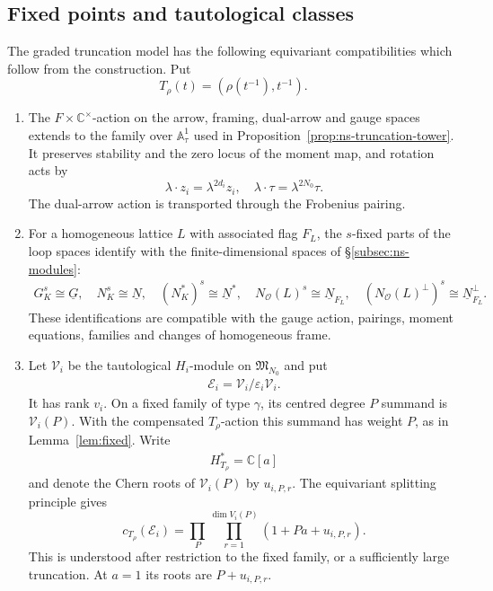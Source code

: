 \documentclass[11pt,reqno]{amsart}
\theoremstyle{definition}
\theoremstyle{remark}
\def\bbC{\mathbb C}
\def\dN{\underline N}
\def\dG{\underline G}
\def\calV{\mathcal V}
\providecommand{\calO}{\mathcal O}
\begin{document}
\subsection{Fixed points and tautological classes}
\label{subsec:ns-lattice-action}
The graded truncation model has the following equivariant
compatibilities which follow from the construction. Put
\[
 T_\rho(t)=(\rho(t^{-1}),t^{-1}).
\]
\begin{enumerate}[label=$\mathrm{(\alph*)}$,leftmargin=8mm]
\item The $F\times\bbC^\times$-action on the arrow, framing, dual-arrow and
gauge spaces extends to the family over $\mathbb A^1_\tau$ used in
Proposition~\ref{prop:ns-truncation-tower}. It preserves stability
and the zero locus of the moment map, and rotation acts by
\begin{equation}\label{eq:ns-action-normalization}
 \lambda\cdot z_i=\lambda^{2d_i}z_i,\quad
 \lambda\cdot\tau=\lambda^{2N_0}\tau.
\end{equation}
The dual-arrow action is transported through the Frobenius pairing.

\item For a homogeneous lattice $L$ with associated flag $F_L$, the
$s$-fixed parts of the loop spaces identify with the finite-dimensional
spaces of \S\ref{subsec:ns-modules}:
\begin{equation}\label{eq:ns-fixed-linear-data}
 \begin{gathered}
 G_K^s\cong\dG,\quad N_K^s\cong\dN,\quad (N_K^*)^s\cong\dN^*,\quad
 N_\calO(L)^s\cong\dN_{F_L},\quad
 (N_\calO(L)^\perp)^s\cong\dN_{F_L}^\perp.
 \end{gathered}
\end{equation}
These identifications are compatible with the gauge action, pairings,
moment equations, families and changes of homogeneous frame.

\item Let $\mathcal V_i$ be the tautological $H_i$-module on
$\mathfrak M_{N_0}$ and put
\begin{align}\label{EI}
 \mathcal E_i=\mathcal V_i/\varepsilon_i\mathcal V_i.
\end{align}
It has rank $v_i$. On a fixed family of type $\gamma$, its
centred degree $P$ summand is $\calV_i(P)$. With the compensated
$T_\rho$-action this summand has weight $P$, as in
Lemma~\ref{lem:fixed}. Write
\begin{align}\label{a}H^*_{T_\rho}=\bbC[a]\end{align}
and denote the Chern roots of $\calV_i(P)$ by $u_{i,P,r}$.
The equivariant splitting principle gives
\begin{equation}\label{eq:ns-tautological-normalization}
 c_{T_\rho}(\mathcal E_i)
   =\prod_P\prod_{r=1}^{\dim V_i(P)}(1+Pa+u_{i,P,r}).
\end{equation}
This is understood after restriction to the fixed family, or a
sufficiently large truncation. At $a=1$ its roots are $P+u_{i,P,r}$.
\end{enumerate}
\end{document}
